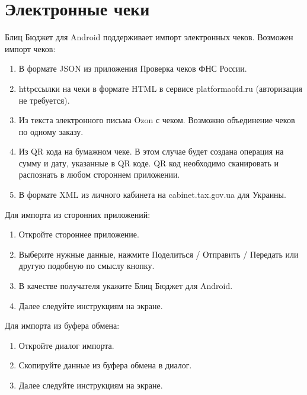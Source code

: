 \documentclass[a4paper,10pt,russian]{sphinxmanual}
\begin{document}
\section{Электронные чеки}
\label{\detokenize{import:id7}}
\sphinxAtStartPar
Блиц Бюджет для Android поддерживает импорт электронных чеков. Возможен импорт чеков:
\begin{enumerate}
%
\item {} 
\sphinxAtStartPar
В формате JSON из приложения Проверка чеков ФНС России.

\item {} 
\sphinxAtStartPar
http\sphinxhyphen{}ссылки на чеки в формате HTML в сервисе platformaofd.ru (авторизация не требуется).

\item {} 
\sphinxAtStartPar
Из текста электронного письма Ozon с чеком. Возможно объединение чеков по одному заказу.

\item {} 
\sphinxAtStartPar
Из QR кода на бумажном чеке. В этом случае будет создана операция на сумму и дату, указанные в QR коде. QR код необходимо сканировать и распознать в любом стороннем приложении.

\item {} 
\sphinxAtStartPar
В формате XML из личного кабинета на cabinet.tax.gov.ua для Украины.

\end{enumerate}

\sphinxAtStartPar
Для импорта из сторонних приложений:
\begin{enumerate}
%
\item {} 
\sphinxAtStartPar
Откройте стороннее приложение.

\item {} 
\sphinxAtStartPar
Выберите нужные данные, нажмите Поделиться / Отправить / Передать или другую подобную по смыслу кнопку.

\item {} 
\sphinxAtStartPar
В качестве получателя укажите Блиц Бюджет для Android.

\item {} 
\sphinxAtStartPar
Далее следуйте инструкциям на экране.

\end{enumerate}

\sphinxAtStartPar
Для импорта из буфера обмена:
\begin{enumerate}
%
\item {} 
\sphinxAtStartPar
Откройте диалог импорта.

\item {} 
\sphinxAtStartPar
Скопируйте данные из буфера обмена в диалог.

\item {} 
\sphinxAtStartPar
Далее следуйте инструкциям на экране.

\end{enumerate}
\end{document}
